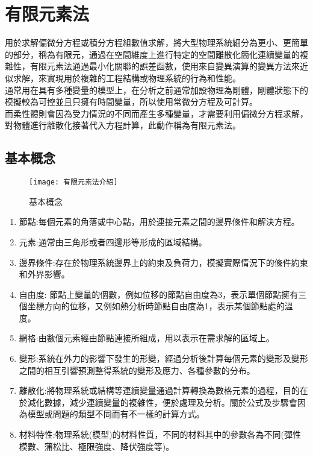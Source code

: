 \chapter{有限元素法}
用於求解偏微分方程或積分方程組數值求解，將大型物理系統細分為更小、更簡單的部分，稱為有限元，通過在空間維度上進行特定的空間離散化簡化連續變量的複雜性，有限元素法通過最小化關聯的誤差函數，使用來自變異演算的變異方法來近似求解，來實現用於複雜的工程結構或物理系統的行為和性能。\\
通常用在具有多種變量的模型上，在分析之前通常加設物理為剛體，剛體狀態下的模擬較為可控並且只擁有時間變量，所以使用常微分方程及可計算。\\
而柔性體則會因為受力情況的不同而產生多種變量，才需要利用偏微分方程求解，對物體進行離散化接著代入方程計算，此動作稱為有限元素法。\\
\section{基本概念}

\begin{figure}[hbt!]
\begin{center}
\texttt{[image: 有限元素法介紹]}
\caption{\Large 基本概念}\label{有限元素法介紹}
\end{center}
\end{figure}
\newpage

\begin{enumerate}
\item 節點:每個元素的角落或中心點，用於連接元素之間的邊界條件和解決方程。
\item 元素:通常由三角形或者四邊形等形成的區域結構。
\item 邊界條件:存在於物理系統邊界上的約束及負荷力，模擬實際情況下的條件約束和外界影響。
\item 自由度: 節點上變量的個數，例如位移的節點自由度為3，表示單個節點擁有三個坐標方向的位移，又例如熱分析時節點自由度為1，表示某個節點處的溫度。
\item 網格:由數個元素經由節點連接所組成，用以表示在需求解的區域上。
\item 變形:系統在外力的影響下發生的形變，經過分析後計算每個元素的變形及變形之間的相互引響預測整得系統的變形及應力、各種參數的分布。
\item 離散化:將物理系統或結構等連續變量通過計算轉換為數格元素的過程，目的在於減化數據，減少連續變量的複雜性，便於處理及分析。關於公式及步驟會因為模型或問題的類型不同而有不一樣的計算方式。
\item 材料特性:物理系統(模型)的材料性質，不同的材料其中的參數各為不同(彈性模數、蒲松比、極限強度、降伏強度等)。\
\end{enumerate}

